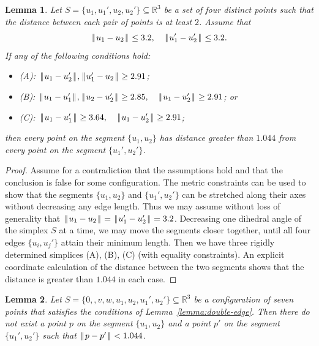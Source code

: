 \documentclass[11pt]{amsart}
\newcommand{\ring}[1]{\mathbb{#1}}
\def\|{{\hskip0.1em|\hskip-0.15em|\hskip0.1em}}
\let\subset=\subseteq
\newtheorem{lemma}{Lemma}
\begin{document}
\begin{lemma}\label{lemma:abc}
Let $S=\{u_1,u_1',u_2,u_2'\}\subset\ring{R}^3$ be a set of four distinct points such that the distance between each pair of points is at least $2$.  Assume that
$$
\|u_1-u_2\|\le 3.2,\quad \|u_1'-u_2'\|\le 3.2.
$$
If any of the following conditions hold:
\begin{itemize}
\item (A): $\|u_1-u_2'\|,\|u_1'-u_2\|\ge 2.91$;
\item (B): $\|u_1-u_1'\|,\|u_2-u_2'\|\ge 2.85,\quad \|u_1-u_2'\|\ge 2.91$; or
\item (C): $\|u_1-u_1'\|\ge 3.64,\quad \|u_1-u_2'\|\ge 2.91$;
\end{itemize}
then every point on the segment $\{u_1,u_2\}$ has distance greater than $1.044$ from every point on the segment $\{u_1',u_2'\}$.
\end{lemma}

\begin{proof} Assume for a contradiction that the assumptions hold and that
the conclusion is false for some configuration.  The metric constraints can be used to show that the segments $\{u_1,u_2\}$ and $\{u_1',u_2'\}$ can be stretched along their axes without decreasing any edge length.  
Thus we may assume without loss of generality that $\|u_1-u_2\|=\|u_1'-u_2'\|=3.2$.  Decreasing one dihedral angle of the simplex $S$ at a time, we may move the segments closer together, until all four edges $\{u_i,u_j'\}$ attain their minimum length.  
Then we have three rigidly determined simplices (A), (B), (C) (with equality constraints).  An explicit coordinate calculation of the distance between the two segments shows that the distance is greater than $1.044$ in each case.
\end{proof}


\begin{lemma}\label{lemma:7big}  
Let $S=\{0,,v,w,u_1,u_2,u_1',u_2'\}\subset\ring{R}^3$
be a configuration of seven points that satisfies
the conditions of Lemma~\ref{lemma:double-edge}.  Then there do not exist
a point $p$ on the segment $\{u_1,u_2\}$ and  a point $p'$ on the segment
$\{u_1',u_2'\}$ such that $\|p-p'\|<1.044$.
\end{lemma}
\end{document}
